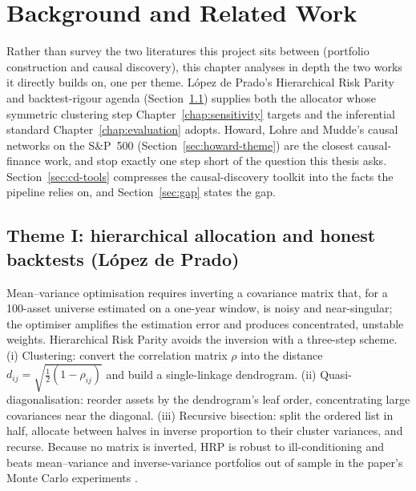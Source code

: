 \chapter{Background and Related Work}
\label{chap:background}

Rather than survey the two literatures this project sits between (portfolio
construction and causal discovery), this chapter analyses in depth the two
works it directly builds on, one per theme. L\'opez de Prado's Hierarchical
Risk Parity and backtest-rigour agenda (Section~\ref{sec:hrp-theme}) supplies
both the allocator whose symmetric clustering step
Chapter~\ref{chap:sensitivity} targets and the inferential standard
Chapter~\ref{chap:evaluation} adopts. Howard, Lohre and Mudde's causal networks on
the S\&P~500 (Section~\ref{sec:howard-theme}) are the closest causal-finance
work, and stop exactly one step short of the question this thesis asks.
Section~\ref{sec:cd-tools}
compresses the causal-discovery toolkit into the facts the pipeline relies
on, and Section~\ref{sec:gap} states the gap.

\section{Theme I: hierarchical allocation and honest backtests
(L\'opez de Prado)}
\label{sec:hrp-theme}

Mean--variance optimisation \cite{markowitz1952portfolio} requires inverting a
covariance matrix that, for a 100-asset universe estimated on a one-year
window, is noisy and near-singular; the optimiser amplifies the estimation
error and produces concentrated, unstable weights. Hierarchical Risk Parity
\cite{lopezdeprado2016hrp} avoids the inversion with a three-step scheme.
(i) Clustering: convert the correlation matrix $\rho$ into the
distance $d_{ij} = \sqrt{\tfrac{1}{2}(1-\rho_{ij})}$ and build a
single-linkage dendrogram. (ii) Quasi-diagonalisation: reorder assets
by the dendrogram's leaf order, concentrating large covariances near the
diagonal. (iii) Recursive bisection: split the ordered list in half,
allocate between halves in inverse proportion to their cluster variances, and
recurse. Because no matrix is inverted, HRP is robust to ill-conditioning and
beats mean--variance and inverse-variance portfolios out of sample in
the paper's Monte Carlo experiments \cite{lopezdeprado2016hrp}.

